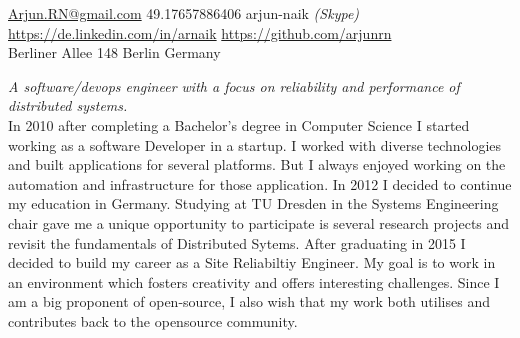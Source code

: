 \documentclass[10pt,a4paper]{article}
\begin{document}
\sloppy  %


\nobreakvspace{0.3em}  %

\noindent\href{mailto:Arjun.RN@gmail.com}{Arjun.RN\mbox{}@\mbox{}gmail.com}\sbull
\textsmaller{+}49.17657886406
\sbull arjun-naik \emph{(Skype)}
\\
\sbull
\href{https://de.linkedin.com/in/arnaik}{https://de.linkedin.com/in/arnaik}
\sbull
\href{https://github.com/arjunrn}{https://github.com/arjunrn}
\\
Berliner Allee 148\sbull
Berlin\sbull
Germany

\spacedhrule{0.9em}{-0.4em}  %


\vspace{-1.3em}  %
\begin{multicols}{2}  %
\noindent \emph{A software/devops engineer with a focus on reliability and performance of distributed systems.}
\\
In 2010 after completing a Bachelor's degree in Computer Science I started working as a software Developer in a startup. I worked with diverse technologies and built applications for several platforms. But I always enjoyed working on the automation and infrastructure for those application. In 2012 I decided to continue my education in Germany. Studying at TU Dresden in the Systems Engineering chair gave me a unique opportunity to participate is several research projects and revisit the fundamentals of Distributed Sytems. After graduating in 2015 I decided to build my career as a Site Reliabiltiy Engineer. My goal is to work in an environment which fosters creativity and offers interesting challenges. Since I am a big proponent of open-source, I also wish that my work both utilises and contributes back to the opensource community.

\end{multicols}
\end{document}
